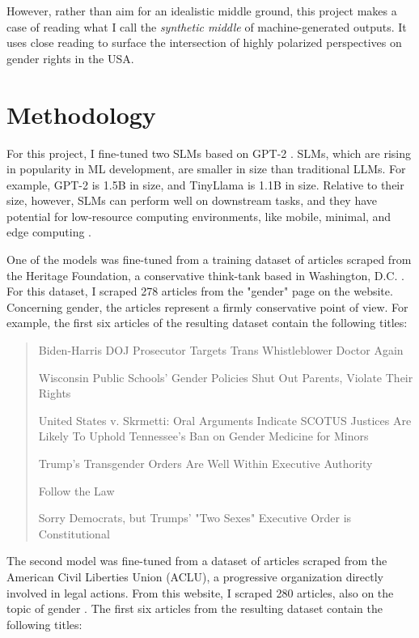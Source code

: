 \documentclass{article}
\begin{document}
However, rather than aim for an idealistic middle ground, this project makes a case of reading what I call the \textit{synthetic middle} of machine-generated outputs. It uses close reading to surface the intersection of highly polarized perspectives on gender rights in the USA. 

\section{Methodology}

For this project, I fine-tuned two SLMs based on GPT-2 \citep{radford_2018}. SLMs, which are rising in popularity in ML development, are smaller in size than traditional LLMs. For example, GPT-2 is 1.5B in size, and TinyLlama is 1.1B in size. Relative to their size, however, SLMs can perform well on downstream tasks, and they have potential for low-resource computing environments, like mobile, minimal, and edge computing \citep{nguyen_2025,wang_2025}.

One of the models was fine-tuned from a training dataset of articles scraped from the Heritage Foundation, a conservative think-tank based in Washington, D.C. \citep{heritage_2026}. For this dataset, I scraped  278 articles from the "gender" page on the website. Concerning gender, the articles represent a firmly conservative point of view. For example, the first six articles of the resulting dataset contain the following titles:

\begin{quote}
Biden-Harris DOJ Prosecutor Targets Trans Whistleblower Doctor Again

Wisconsin Public Schools' Gender Policies Shut Out Parents, Violate Their Rights

United States v. Skrmetti: Oral Arguments Indicate SCOTUS Justices Are Likely To Uphold Tennessee's Ban on Gender Medicine for Minors

Trump's Transgender Orders Are Well Within Executive Authority

Follow the Law

Sorry Democrats, but Trumps' "Two Sexes" Executive Order is Constitutional

\end{quote}

The second model was fine-tuned from a dataset of articles scraped from the American Civil Liberties Union (ACLU), a progressive organization directly involved in legal actions. From this website, I scraped 280 articles, also on the topic of gender \citep{aclu_2026}. The first six articles from the resulting dataset contain the following titles:
\end{document}
